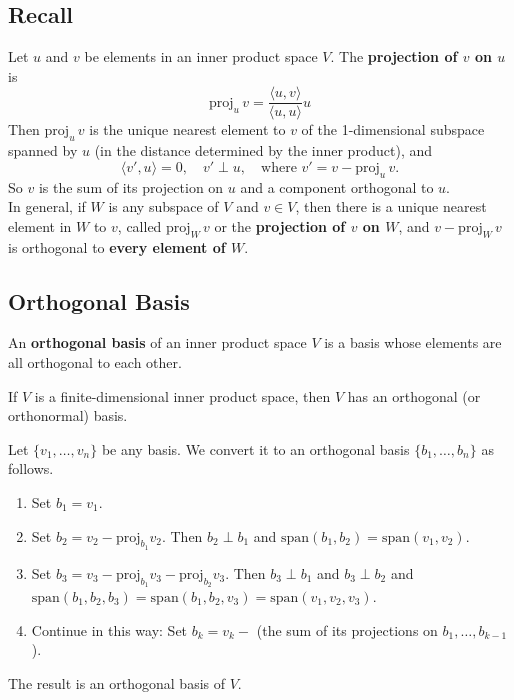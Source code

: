 \documentclass[a4paper, 9pt]{extarticle}
\begin{document}
\subsection{Recall}
Let $u$ and $v$ be elements in an inner product space $V$. The \textbf{projection of $v$ on $u$} is
$$
  \text{proj}_u\,v = \frac{\langle u, v \rangle}{\langle u, u \rangle} u
$$
Then $\text{proj}_u\,v$ is the unique nearest element to $v$ of the 1-dimensional subspace spanned by $u$ (in the distance determined by the inner product), and
$$
  \langle v', u \rangle = 0,\quad v' \perp u,\quad \text{where } v' = v - \text{proj}_u\,v.
$$
So $v$ is the sum of its projection on $u$ and a component orthogonal to $u$. \\[2ex]
In general, if $W$ is any subspace of $V$ and $v \in V$, then there is a unique nearest element in $W$ to $v$, called $\text{proj}_W\,v$ or the \textbf{projection of $v$ on $W$},
and $v - \text{proj}_W\,v$ is orthogonal to \textbf{every element of $W$}.
\subsection{Orthogonal Basis}
An \textbf{orthogonal basis} of an inner product space $V$ is a basis whose elements are all orthogonal to each other.
\begin{theorembox}{}{}
  If $V$ is a finite-dimensional inner product space, then $V$ has an orthogonal (or orthonormal) basis.
\end{theorembox}
\noindent Let $\{v_1, \dots, v_n\}$ be any basis. We convert it to an orthogonal basis $\{b_1, \dots, b_n\}$ as follows.

\begin{enumerate}
  \item Set $b_1 = v_1$.
  \item Set $b_2 = v_2 - \text{proj}_{b_1} v_2$. Then $b_2 \perp b_1$ and
        $\text{span}(b_1, b_2) = \text{span}(v_1, v_2)$.
  \item Set $b_3 = v_3 - \text{proj}_{b_1} v_3 - \text{proj}_{b_2} v_3$.
        Then $b_3 \perp b_1$ and $b_3 \perp b_2$ and
        $\text{span}(b_1, b_2, b_3) = \text{span}(b_1, b_2, v_3) = \text{span}(v_1, v_2, v_3)$.
  \item Continue in this way: Set $b_k = v_k -$ (the sum of its projections on $b_1, \dots, b_{k-1}$).
\end{enumerate}

The result is an orthogonal basis of $V$.
\end{document}
